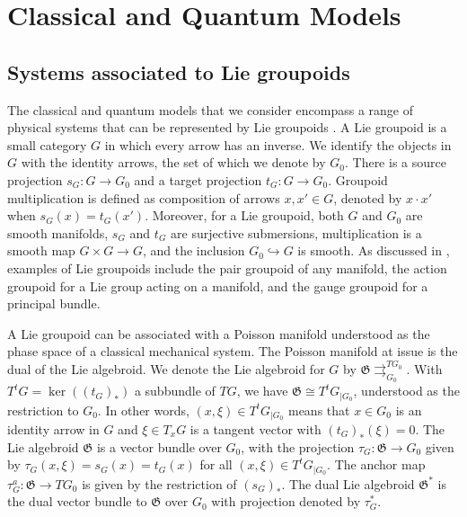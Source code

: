 \documentclass[sn-mathphys,Numbered]{sn-jnl}
\begin{document}
\section{Classical and Quantum Models}
\label{sec:objects}

\subsection{Systems associated to Lie groupoids}

The classical and quantum models that we consider encompass a range of physical systems that can be represented by Lie groupoids \citep{Ma87,We00}.  A Lie groupoid is a small category $G$ in which every arrow has an inverse.  We identify the objects in $G$ with the identity arrows, the set of which we denote by $G_0$.  There is a source projection $s_G: G\to G_0$ and a target projection $t_G: G\to G_0$.  Groupoid multiplication is defined as composition of arrows $x,x'\in G$, denoted by $x\cdot x'$ when $s_G(x) = t_G(x')$.  Moreover, for a Lie groupoid, both $G$ and $G_0$ are smooth manifolds, $s_G$ and $t_G$ are surjective submersions, multiplication is a smooth map $G\times G\to G$, and the inclusion $G_0\hookrightarrow G$ is smooth.  As discussed in \citet{La98b,La99}, examples of Lie groupoids include the pair groupoid of any manifold, the action groupoid for a Lie group acting on a manifold, and the gauge groupoid for a principal bundle.

A Lie groupoid can be associated with a Poisson manifold understood as the phase space of a classical mechanical system.  The Poisson manifold at issue is the dual of the Lie algebroid.  We denote the Lie algebroid for $G$ by $\mathfrak{G}\rightrightarrows^{TG_0}_{G_0}$.  With $T^tG = \ker((t_G)_*)$ a subbundle of $TG$, we have $\mathfrak{G}\cong T^tG_{|{G_0}}$, understood as the restriction to $G_0$.  In other words, $(x,\xi)\in T^tG_{|G_0}$ means that $x\in G_0$ is an identity arrow in $G$ and $\xi\in T_xG$ is a tangent vector with $(t_G)_*(\xi)=0$.  The Lie algebroid $\mathfrak{G}$ is a vector bundle over $G_0$, with the projection $\tau_G:\mathfrak{G}\to G_0$ given by $\tau_G(x,\xi) = s_G(x) = t_G(x)$ for all $(x,\xi)\in T^tG_{|G_0}$.  The anchor map $\tau^a_G: \mathfrak{G}\to TG_0$ is given by the restriction of $(s_G)_*$.  The dual Lie algebroid $\mathfrak{G}^*$ is the dual vector bundle to $\mathfrak{G}$ over $G_0$ with projection denoted by $\tau^*_G$.
\end{document}
